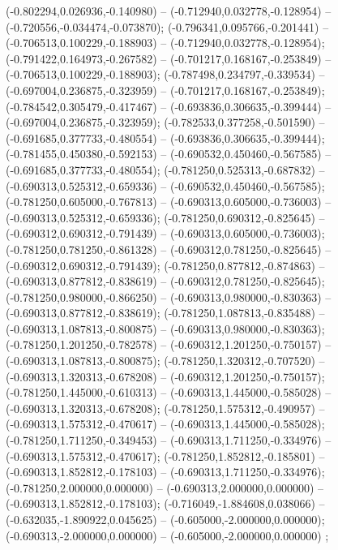  (-0.802294,0.026936,-0.140980) -- (-0.712940,0.032778,-0.128954) -- (-0.720556,-0.034474,-0.073870);
 (-0.796341,0.095766,-0.201441) -- (-0.706513,0.100229,-0.188903) -- (-0.712940,0.032778,-0.128954);
 (-0.791422,0.164973,-0.267582) -- (-0.701217,0.168167,-0.253849) -- (-0.706513,0.100229,-0.188903);
 (-0.787498,0.234797,-0.339534) -- (-0.697004,0.236875,-0.323959) -- (-0.701217,0.168167,-0.253849);
 (-0.784542,0.305479,-0.417467) -- (-0.693836,0.306635,-0.399444) -- (-0.697004,0.236875,-0.323959);
 (-0.782533,0.377258,-0.501590) -- (-0.691685,0.377733,-0.480554) -- (-0.693836,0.306635,-0.399444);
 (-0.781455,0.450380,-0.592153) -- (-0.690532,0.450460,-0.567585) -- (-0.691685,0.377733,-0.480554);
 (-0.781250,0.525313,-0.687832) -- (-0.690313,0.525312,-0.659336) -- (-0.690532,0.450460,-0.567585);
 (-0.781250,0.605000,-0.767813) -- (-0.690313,0.605000,-0.736003) -- (-0.690313,0.525312,-0.659336);
 (-0.781250,0.690312,-0.825645) -- (-0.690312,0.690312,-0.791439) -- (-0.690313,0.605000,-0.736003);
 (-0.781250,0.781250,-0.861328) -- (-0.690312,0.781250,-0.825645) -- (-0.690312,0.690312,-0.791439);
 (-0.781250,0.877812,-0.874863) -- (-0.690313,0.877812,-0.838619) -- (-0.690312,0.781250,-0.825645);
 (-0.781250,0.980000,-0.866250) -- (-0.690313,0.980000,-0.830363) -- (-0.690313,0.877812,-0.838619);
 (-0.781250,1.087813,-0.835488) -- (-0.690313,1.087813,-0.800875) -- (-0.690313,0.980000,-0.830363);
 (-0.781250,1.201250,-0.782578) -- (-0.690312,1.201250,-0.750157) -- (-0.690313,1.087813,-0.800875);
 (-0.781250,1.320312,-0.707520) -- (-0.690313,1.320313,-0.678208) -- (-0.690312,1.201250,-0.750157);
 (-0.781250,1.445000,-0.610313) -- (-0.690313,1.445000,-0.585028) -- (-0.690313,1.320313,-0.678208);
 (-0.781250,1.575312,-0.490957) -- (-0.690313,1.575312,-0.470617) -- (-0.690313,1.445000,-0.585028);
 (-0.781250,1.711250,-0.349453) -- (-0.690313,1.711250,-0.334976) -- (-0.690313,1.575312,-0.470617);
 (-0.781250,1.852812,-0.185801) -- (-0.690313,1.852812,-0.178103) -- (-0.690313,1.711250,-0.334976);
 (-0.781250,2.000000,0.000000) -- (-0.690313,2.000000,0.000000) -- (-0.690313,1.852812,-0.178103);
 (-0.716049,-1.884608,0.038066) -- (-0.632035,-1.890922,0.045625) -- (-0.605000,-2.000000,0.000000);
 (-0.690313,-2.000000,0.000000) -- (-0.605000,-2.000000,0.000000) ;
